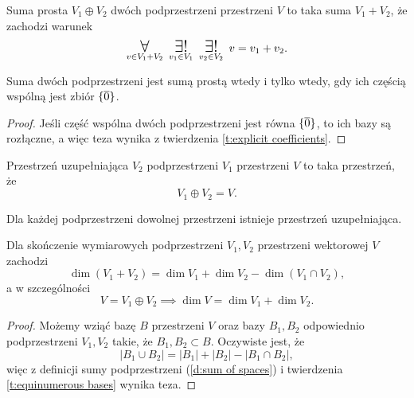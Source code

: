 \begin{definition}
    Suma prosta $V_1 \oplus V_2$ dwóch podprzestrzeni przestrzeni $V$ to taka suma $V_1 + V_2$, że zachodzi warunek
    \[ \dforall{v \in V_1 + V_2} \dexistsone{v_1 \in V_1} \dexistsone{v_2 \in V_2} v = v_1 + v_2. \]
\end{definition}

\begin{theorem}
    Suma dwóch podprzestrzeni jest sumą prostą wtedy i tylko wtedy, gdy ich częścią wspólną jest zbiór $\{\overline{0}\}$.
\end{theorem}
\begin{proof}
    Jeśli część wspólna dwóch podprzestrzeni jest równa $\{\overline{0}\}$, to ich bazy są rozłączne, a więc teza wynika z twierdzenia \ref{t:explicit coefficients}.
\end{proof}

\begin{definition}
    Przestrzeń uzupełniająca $V_2$ podprzestrzeni $V_1$ przestrzeni $V$ to taka przestrzeń, że
    \[ V_1 \oplus V_2 = V. \]
\end{definition}

\begin{fact}
    Dla każdej podprzestrzeni dowolnej przestrzeni istnieje przestrzeń uzupełniająca.
\end{fact}

\begin{theorem}[Grassmana]
    Dla skończenie wymiarowych podprzestrzeni $V_1, V_2$ przestrzeni wektorowej $V$ zachodzi
    \[ \dim(V_1 + V_2) = \dim V_1 + \dim V_2 - \dim(V_1 \cap V_2), \]
    a w szczególności
    \[ V = V_1 \oplus V_2 \implies \dim V = \dim V_1 + \dim V_2. \]
\end{theorem}
\begin{proof}
    Możemy wziąć bazę $B$ przestrzeni $V$ oraz bazy $B_1, B_2$ odpowiednio podprzestrzeni $V_1, V_2$ takie, że $B_1, B_2 \subset B$. Oczywiste jest, że
    \[ |B_1 \cup B_2| = |B_1| + |B_2| - |B_1 \cap B_2|, \]
    więc z definicji sumy podprzestrzeni (\ref{d:sum of spaces}) i twierdzenia \ref{t:equinumerous bases} wynika teza.
\end{proof}
